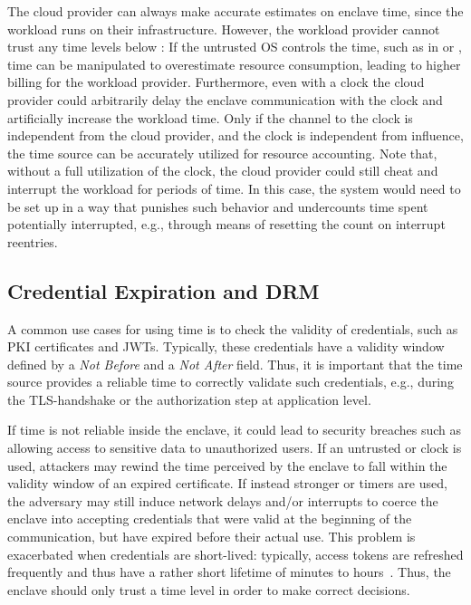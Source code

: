 The cloud provider can always make accurate estimates on enclave time, since the
workload runs on their infrastructure. However, the workload provider cannot
trust any time levels below \Tthree{}: If the untrusted OS controls the time,
such as in \Tzero or \Tone, time can be manipulated to overestimate resource
consumption, leading to higher billing for the workload provider. Furthermore,
even with a \Ttwo clock the cloud provider could arbitrarily delay the enclave
communication with the clock and artificially increase the workload time. Only
if the channel to the clock is independent from the cloud provider, and the
clock is independent from influence, the time source can be accurately utilized
for resource accounting. Note that, without a full \Tfour utilization of the
clock, the cloud provider could still cheat and interrupt the workload for
periods of time. In this case, the system would need to be set up in a way that
punishes such behavior and undercounts time spent potentially interrupted, e.g.,
through means of resetting the count on interrupt reentries.

\subsection{Credential Expiration and DRM}
\label{sec:usecases:tfour}
%
A common use cases for using time is to check the validity of credentials, such
as PKI certificates and \acp{JWT}. Typically, these credentials have a validity
window defined by a \emph{Not Before} and a \emph{Not After} field. Thus, it is
important that the time source provides a reliable time to correctly validate
such credentials, e.g., during the TLS-handshake or the authorization step at
application level.

If time is not reliable inside the enclave, it could lead to security breaches
such as allowing access to sensitive data to unauthorized users. If an untrusted
\Tzero{} or \Tone{} clock is used, attackers may rewind the time perceived by
the enclave to fall within the validity window of an expired certificate. If
instead stronger \Ttwo{} or \Tthree{} timers are used, the adversary may still
induce network delays and/or interrupts to coerce the enclave into accepting
credentials that were valid at the beginning of the communication, but have
expired before their actual use. This problem is exacerbated when credentials
are short-lived: typically, access tokens are refreshed frequently and thus have
a rather short lifetime of minutes to hours~\cite{rfc6819}. Thus, the enclave
should only trust a time level \Tfour{} in order to make correct decisions.

